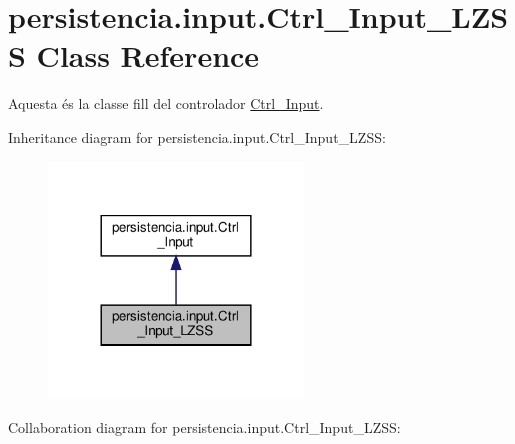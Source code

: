\hypertarget{classpersistencia_1_1input_1_1Ctrl__Input__LZSS}{}\section{persistencia.\+input.\+Ctrl\+\_\+\+Input\+\_\+\+L\+Z\+SS Class Reference}
\label{classpersistencia_1_1input_1_1Ctrl__Input__LZSS}


Aquesta és la classe fill del controlador \hyperlink{classpersistencia_1_1input_1_1Ctrl__Input}{Ctrl\+\_\+\+Input}.  




Inheritance diagram for persistencia.\+input.\+Ctrl\+\_\+\+Input\+\_\+\+L\+Z\+SS\+:\nopagebreak
\begin{figure}[H]
\begin{center}
\leavevmode
\includegraphics[width=192pt]{classpersistencia_1_1input_1_1Ctrl__Input__LZSS__inherit__graph}
\end{center}
\end{figure}


Collaboration diagram for persistencia.\+input.\+Ctrl\+\_\+\+Input\+\_\+\+L\+Z\+SS\+:
